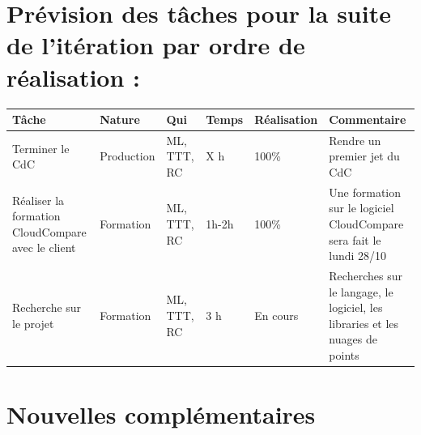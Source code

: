 \documentclass[12pt,titlepage,french]{article}
\begin{document}
\section{Prévision des tâches pour la suite de l'itération par ordre de réalisation :}

\noindent\begin{tabularx}{17cm}{|p{2.5cm}|p{2.5cm}|p{1cm}|p{1.5cm}|p{2.5cm}|X|}
    \hline
    \textbf{Tâche} & \textbf{Nature} & \textbf{Qui} & \textbf{Temps} & \textbf{Réalisation} & \textbf{Commentaire} \\
    \hline
    Terminer le CdC & Production & ML, TTT, RC & X h & 100\% & Rendre un premier jet du CdC \\
    \hline
    Réaliser la formation CloudCompare avec le client & Formation & ML, TTT, RC & 1h-2h & 100\% & Une formation sur le logiciel CloudCompare sera fait le lundi 28/10 \\
    \hline
    Recherche sur le projet & Formation & ML, TTT, RC & 3 h & En cours & Recherches sur le langage, le logiciel, les libraries et les nuages de points \\
    \hline
\end{tabularx}
\section{Nouvelles complémentaires}
\end{document}
